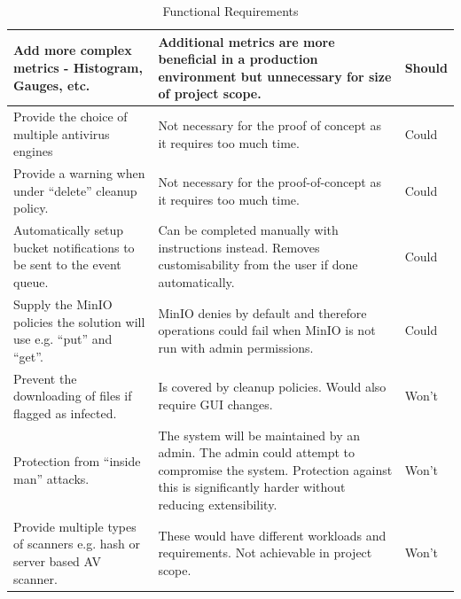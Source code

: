\documentclass[12pt, conference, final, a4paper, onecolumn, compsoc]{IEEEtran}
\begin{document}
\begin{table}[H]
\begin{tabular}{|p{}|p{}|l|}
    Add more complex metrics - Histogram, Gauges, etc. & Additional metrics are
                                                        more beneficial in a production environment but unnecessary for size of project
                                                        scope. & Should \\ \hline \hline Provide the choice of multiple antivirus
    engines & Not necessary for the proof of concept as it requires too much time. &
                                                                                     Could \\ \hline Provide a warning when under ``delete'' cleanup policy. & Not
                                                                                                                                                              necessary for the proof-of-concept as it requires too much time. & Could \\
    \hline Automatically setup bucket notifications to be sent to the event queue. & Can be completed
                                                               manually with instructions instead. Removes customisability from the user if
                                                               done automatically. & Could \\ \hline Supply the MinIO policies the solution
    will use e.g. ``put'' and ``get''. & MinIO denies by default and therefore
                                         operations could fail when MinIO is not run with admin permissions. & Could \\
    \hline \hline

    Prevent the downloading of files if flagged as infected. & Is
                                                              covered by cleanup policies. Would also require GUI changes. & Won't \\ \hline
    Protection from ``inside man'' attacks. & The system will be maintained by an
                                             admin. The admin could attempt to compromise the system. Protection against this
                                             is significantly harder without reducing extensibility. & Won't \\ \hline Provide
    multiple types of scanners e.g. hash or server based AV scanner. & These would
                                                                      have different workloads and requirements. Not achievable in project scope. &
                                                                                                                                                    Won't \\ \hline
  \end{tabular}
  \caption{Functional Requirements}
  \label{tab:functional-reqs}
\end{table}
\end{document}
